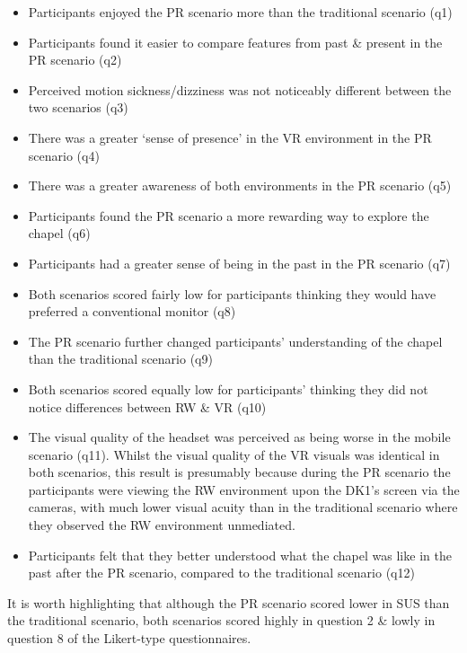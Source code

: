\begin{itemize}
	\item Participants enjoyed the PR scenario more than the traditional scenario (q1)
	\item Participants found it easier to compare features from past \& present in the PR scenario (q2)
	\item Perceived motion sickness/dizziness was not noticeably different between the two scenarios (q3)
	\item There was a greater ‘sense of presence’ in the VR environment in the PR scenario (q4)
	\item There was a greater awareness of both environments in the PR scenario (q5)
	\item Participants found the PR scenario a more rewarding way to explore the chapel (q6)
	\item Participants had a greater sense of being in the past in the PR scenario (q7)
	\item Both scenarios scored fairly low for participants thinking they would have preferred a conventional monitor (q8)
	\item The PR scenario further changed participants’ understanding of the chapel than the traditional scenario (q9)
	\item Both scenarios scored equally low for participants’ thinking they did not notice differences between RW \& VR (q10)
	\item The visual quality of the headset was perceived as being worse in the mobile scenario (q11). Whilst the visual quality of the VR visuals was identical in both scenarios, this result is presumably because during the PR scenario the participants were viewing the RW environment upon the DK1's screen via the cameras, with much lower visual acuity than in the traditional scenario where they observed the RW environment unmediated.
	\item Participants felt that they better understood what the chapel was like in the past after the PR scenario, compared to the traditional scenario (q12)
\end{itemize}

It is worth highlighting that although the PR scenario scored lower in SUS than the traditional scenario, both scenarios scored highly in question 2 \& lowly in question 8 of the Likert-type questionnaires.


